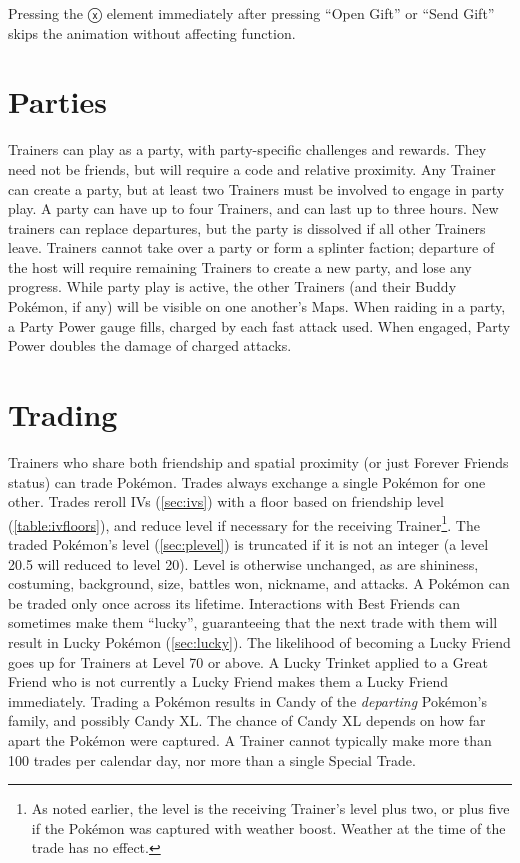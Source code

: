 \begin{tipbox}[title=A tip regarding gift UI]
Pressing the ⓧ  element immediately after pressing ``Open Gift'' or ``Send Gift''
 skips the animation without affecting function.
\end{tipbox}

\section{Parties\label{sec:parties}}
Trainers can play as a party, with party-specific challenges and rewards.
They need not be friends, but will require a code and relative proximity.
Any Trainer can create a party, but at least two Trainers must be involved to engage in party play.
A party can have up to four Trainers, and can last up to three hours.
New trainers can replace departures, but the party is dissolved if all other Trainers leave.
Trainers cannot take over a party or form a splinter faction; departure of the host will
  require remaining Trainers to create a new party, and lose any progress.
While party play is active, the other Trainers (and their Buddy Pokémon, if any)
  will be visible on one another's Maps.
When raiding in a party, a Party Power gauge fills, charged by each fast attack used.
When engaged, Party Power doubles the damage of charged attacks.

\section{Trading\label{sec:trades}}
Trainers who share both friendship and spatial proximity (or just Forever Friends status) can trade Pokémon.
Trades always exchange a single Pokémon for one other.
Trades reroll IVs (\autoref{sec:ivs}) with a floor based on friendship level (\autoref{table:ivfloors}),
  and reduce level if necessary for the receiving Trainer\footnote{As noted earlier, the level is
  the receiving Trainer's level plus two, or plus five if the Pokémon was captured with weather boost.
  Weather at the time of the trade has no effect.}.
The traded Pokémon's level (\autoref{sec:plevel}) is truncated if it is not an integer (a level 20.5
 will reduced to level 20).
Level is otherwise unchanged, as are shininess, costuming, background, size, battles won, nickname, and attacks.
A Pokémon can be traded only once across its lifetime.
Interactions with Best Friends can sometimes make them ``lucky'', guaranteeing that the next trade with
  them will result in Lucky Pokémon (\autoref{sec:lucky}).
The likelihood of becoming a Lucky Friend goes up for Trainers at Level 70 or above.
A Lucky Trinket applied to a Great Friend who is not currently a Lucky Friend makes them
 a Lucky Friend immediately.
Trading a Pokémon results in Candy of the \textit{departing} Pokémon's family,
  and possibly Candy XL\@.
The chance of Candy XL depends on how far apart the Pokémon were captured.
A Trainer cannot typically make more than 100 trades per calendar day, nor more
 than a single Special Trade.

